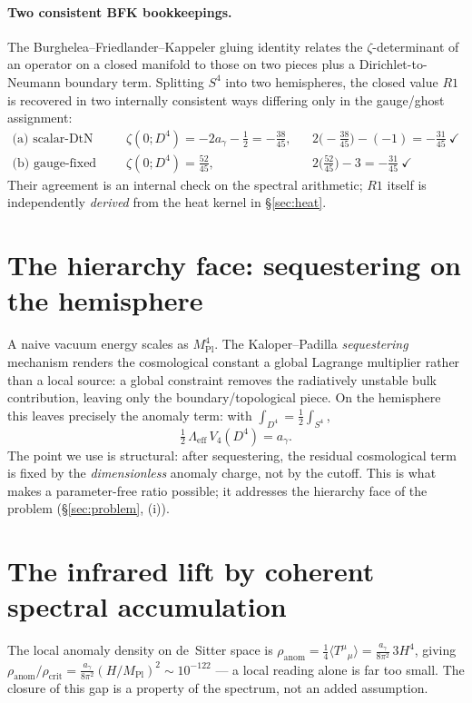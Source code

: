 \documentclass[11pt,a4paper]{article}
\theoremstyle{definition}
\theoremstyle{remark}
\newcommand{\ag}{a_\gamma}
\newcommand{\Mpl}{M_{\mathrm{Pl}}}
\newcommand{\avg}[1]{\langle #1\rangle}
\begin{document}
\paragraph{Two consistent BFK bookkeepings.} The Burghelea--Friedlander--Kappeler gluing identity
relates the $\zeta$-determinant of an operator on a closed manifold to those on two pieces plus a
Dirichlet-to-Neumann boundary term. Splitting $S^4$ into two hemispheres, the closed value $R1$ is
recovered in two internally consistent ways differing only in the gauge/ghost assignment:
\begin{align}
\text{(a) scalar-DtN split:}\quad
&\zeta(0;D^4)=-2\ag-\tfrac12=-\tfrac{38}{45},
&&2\bigl(-\tfrac{38}{45}\bigr)-(-1)=-\tfrac{31}{45}\ \checkmark\\
\text{(b) gauge-fixed split:}\quad
&\zeta(0;D^4)=\tfrac{52}{45},
&&2\bigl(\tfrac{52}{45}\bigr)-3=-\tfrac{31}{45}\ \checkmark
\end{align}
Their agreement is an internal check on the spectral arithmetic; $R1$ itself is independently
\emph{derived} from the heat kernel in \S\ref{sec:heat}.

\section{The hierarchy face: sequestering on the hemisphere}\label{sec:seq}
A naive vacuum energy scales as $\Mpl^4$. The Kaloper--Padilla \emph{sequestering} mechanism
renders the cosmological constant a global Lagrange multiplier rather than a local source: a global
constraint removes the radiatively unstable bulk contribution, leaving only the boundary/topological
piece. On the hemisphere this leaves precisely the anomaly term: with $\int_{D^4}=\tfrac12\int_{S^4}$,
\begin{equation}\label{eq:sequester}
\tfrac12\,\Lambda_{\mathrm{eff}}\,V_4(D^4)=\ag .
\end{equation}
The point we use is structural: after sequestering, the residual cosmological term is fixed by the
\emph{dimensionless} anomaly charge, not by the cutoff. This is what makes a parameter-free ratio
possible; it addresses the hierarchy face of the problem (\S\ref{sec:problem}, (i)).

\section{The infrared lift by coherent spectral accumulation}\label{sec:lift}
The local anomaly density on de~Sitter space is
$\rho_{\mathrm{anom}}=\tfrac14\avg{T^\mu{}_\mu}=\tfrac{\ag}{8\pi^2}\,3H^4$, giving
$\rho_{\mathrm{anom}}/\rho_{\mathrm{crit}}=\tfrac{\ag}{8\pi^2}(H/\Mpl)^2\sim10^{-122}$ --- a local
reading alone is far too small. The closure of this gap is a property of the spectrum, not an added
assumption.
\end{document}
